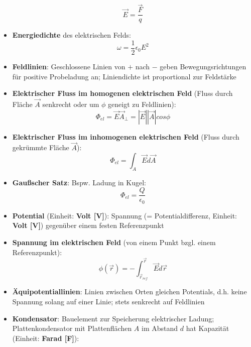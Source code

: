 \begin{itemize}
	\begin{equation}
		\vec{E} = \frac{\vec{F}}{q}
	\end{equation}
	\item \textbf{Energiedichte} des elektrischen Felds:
	\begin{equation}
		\omega = \frac{1}{2}\epsilon_0E^2
	\end{equation}
	\item \textbf{Feldlinien}: Geschlossene Linien von $+$ nach $-$ geben Bewegungsrichtungen für positive Probeladung an; Liniendichte ist proportional zur Feldstärke
	\item \textbf{Elektrischer Fluss im homogenen elektrischen Feld} (Fluss durch Fläche $\vec{A}$ senkrecht oder um $\phi$ geneigt zu Feldlinien):
	\begin{equation}
		\Phi_{el} = \vec{E}\vec{A}_\perp = |\vec{E}||\vec{A}|cos\phi
	\end{equation}
	\item \textbf{Elektrischer Fluss im inhomogenen elektrischen Feld} (Fluss durch gekrümmte Fläche $\vec{A}$):
	\begin{equation}
		\Phi_{el} = \int_A \vec{E}d\vec{A}
	\end{equation}
	\item \textbf{Gaußscher Satz}:  Bspw. Ladung in Kugel:
	\begin{equation}
		\Phi_{el} = \frac{Q}{\epsilon_0}
	\end{equation}
	\item \textbf{Potential} (Einheit: \textbf{Volt [V]}): Spannung (= Potentialdifferenz, Einheit: \textbf{Volt [V]}) gegenüber einem festen Referenzpunkt
	\item \textbf{Spannung im elektrischen Feld} (von einem Punkt bzgl. einem Referenzpunkt):
	\begin{equation}
		\phi(\vec{r}) = -\int_{\vec{r}_{ref}}^{\vec{r}} \vec{E}d\vec{r}
	\end{equation}
	\item \textbf{Äquipotentiallinien}: Linien zwischen Orten gleichen Potentials, d.h. keine Spannung solang auf einer Linie; stets senkrecht auf Feldlinien
	\item \textbf{Kondensator}: Bauelement zur Speicherung elektrischer Ladung; Plattenkondensator mit Plattenflächen $A$ im Abstand $d$ hat Kapazität (Einheit: \textbf{Farad [F]}):
	\begin{equation}

\end{equation}
\end{itemize}
